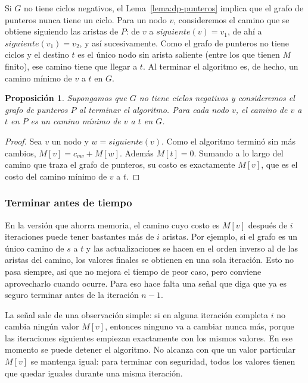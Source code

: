 \documentclass[12pt, spanish, oneside, openany]{book}
\theoremstyle{uprightplain}
\newtheorem{proposicion}[teorema]{Proposición}
\theoremstyle{definition}
\theoremstyle{remark}
\theoremstyle{definition}
\begin{document}
Si $G$ no tiene ciclos negativos, el Lema~\ref{lema:dp-punteros} implica que el grafo de punteros nunca tiene un ciclo. Para un nodo $v$, consideremos el camino que se obtiene siguiendo las aristas de $P$: de $v$ a $\mathit{siguiente}(v)=v_1$, de ahí a $\mathit{siguiente}(v_1)=v_2$, y así sucesivamente. Como el grafo de punteros no tiene ciclos y el destino $t$ es el único nodo sin arista saliente (entre los que tienen $M$ finito), ese camino tiene que llegar a $t$. Al terminar el algoritmo es, de hecho, un camino mínimo de $v$ a $t$ en $G$.

\begin{proposicion}
\label{prop:dp-punteros-caminos}
Supongamos que $G$ no tiene ciclos negativos y consideremos el grafo de punteros $P$ al terminar el algoritmo. Para cada nodo $v$, el camino de $v$ a $t$ en $P$ es un camino mínimo de $v$ a $t$ en $G$.
\end{proposicion}
\begin{proof}
Sea $v$ un nodo y $w=\mathit{siguiente}(v)$. Como el algoritmo terminó sin más cambios, $M[v]=c_{vw}+M[w]$. Además $M[t]=0$. Sumando a lo largo del camino que traza el grafo de punteros, su costo es exactamente $M[v]$, que es el costo del camino mínimo de $v$ a $t$.
\end{proof}

\subsubsection{Terminar antes de tiempo}

En la versión que ahorra memoria, el camino cuyo costo es $M[v]$ después de $i$ iteraciones puede tener bastantes más de $i$ aristas. Por ejemplo, si el grafo es un único camino de $s$ a $t$ y las actualizaciones se hacen en el orden inverso al de las aristas del camino, los valores finales se obtienen en una sola iteración. Esto no pasa siempre, así que no mejora el tiempo de peor caso, pero conviene aprovecharlo cuando ocurre. Para eso hace falta una señal que diga que ya es seguro terminar antes de la iteración $n-1$.

La señal sale de una observación simple: si en alguna iteración completa $i$ no cambia ningún valor $M[v]$, entonces ninguno va a cambiar nunca más, porque las iteraciones siguientes empiezan exactamente con los mismos valores. En ese momento se puede detener el algoritmo. No alcanza con que un valor particular $M[v]$ se mantenga igual: para terminar con seguridad, todos los valores tienen que quedar iguales durante una misma iteración.
\end{document}
